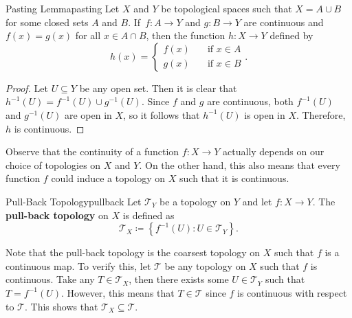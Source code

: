 \documentclass[math]{amznotes}
\theoremstyle{remark}
\begin{document}
\begin{lembox}{Pasting Lemma}{pasting}
    Let $X$ and $Y$ be topological spaces such that $X = A \cup B$ for some closed sets $A$ and $B$. If~$f \colon A \to Y$ and $g \colon B \to Y$ are continuous and $f\left(x\right) = g\left(x\right)$ for all $x \in A \cap B$, then the function $h \colon X \to Y$ defined by 
    \begin{equation*}
        h\left(x\right) = \begin{cases}
            f\left(x\right) & \quad\textrm{if } x \in A \\
            g\left(x\right) & \quad\textrm{if } x \in B
        \end{cases}.
    \end{equation*}
    \tcblower
    \begin{proof}
        Let $U \subseteq Y$ be any open set. Then it is clear that $h^{-1}\left(U\right) = f^{-1}\left(U\right) \cup g^{-1}\left(U\right)$. Since $f$ and $g$ are continuous, both $f^{-1}\left(U\right)$ and $g^{-1}\left(U\right)$ are open in $X$, so it follows that $h^{-1}\left(U\right)$ is open in $X$. Therefore, $h$ is continuous.
    \end{proof}
\end{lembox}
Observe that the continuity of a function $f \colon X \to Y$ actually depends on our choice of topologies on $X$ and $Y$. On the other hand, this also means that every function $f$ could induce a topology on $X$ such that it is continuous.
\begin{dfnbox}{Pull-Back Topology}{pullback}
    Let $\mathcal{T}_Y$ be a topology on $Y$ and let $f \colon X \to Y$. The {\color{red} \textbf{pull-back topology}} on $X$ is defined as 
    \begin{equation*}
        \mathcal{T}_X \coloneqq \left\{f^{-1}\left(U\right) \colon U \in \mathcal{T}_Y\right\}.
    \end{equation*}
\end{dfnbox}
Note that the pull-back topology is the coarsest topology on $X$ such that $f$ is a continuous map. To verify this, let $\mathcal{T}$ be any topology on $X$ such that $f$ is continuous. Take any $T \in \mathcal{T}_X$, then there exists some $U \in \mathcal{T}_Y$ such that $T = f^{-1}\left(U\right)$. However, this means that $T \in \mathcal{T}$ since $f$ is continuous with respect to $\mathcal{T}$. This shows that $\mathcal{T}_X \subseteq \mathcal{T}$.
\end{document}
